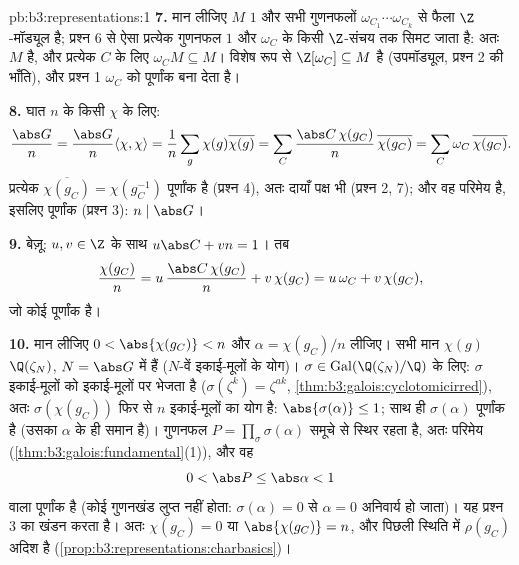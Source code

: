 \begin{solution}{pb:b3:representations:1}
\textbf{7.} मान लीजिए $M$ $1$ और सभी गुणनफलों $\omega_{C_1}\cdots\omega_{C_k}$ से फैला
$\Z$-मॉड्यूल है; प्रश्न 6 से ऐसा प्रत्येक गुणनफल $1$ और $\omega_C$
के किसी $\Z$-संचय तक सिमट जाता है: अतः $M$  है, और
प्रत्येक $C$ के लिए $\omega_C M
\subseteq M$। विशेष रूप से $\Z[\omega_C]
\subseteq M$  है
(उपमॉड्यूल, प्रश्न 2 की भाँति), और प्रश्न 1 $\omega_C$ को  पूर्णांक
बना देता है।

\textbf{8.} घात $n$ के किसी  $\chi$ के लिए:
\[
\frac{\abs G}{n} = \frac{\abs G}{n}\langle\chi,\chi\rangle
= \frac1n \sum_{g}\chi(g)\overline{\chi(g)}
= \sum_{C}\frac{\abs C\,\chi(g_C)}{n}\,\overline{\chi(g_C)}
= \sum_C \omega_C\,\overline{\chi(g_C)} .
\]
प्रत्येक $\overline{\chi(g_C)} = \chi(g_C^{-1})$  पूर्णांक है (प्रश्न 4), अतः दायाँ पक्ष भी
(प्रश्न 2, 7); और वह परिमेय है, इसलिए पूर्णांक (प्रश्न 3): $n \mid \abs
G$।

\textbf{9.} बेज़ू: $u, v \in \Z$ के साथ $u\abs C + vn = 1$। तब
\[
\frac{\chi(g_C)}{n} = u\,\frac{\abs C\,\chi(g_C)}{n} +
v\,\chi(g_C) = u\,\omega_C + v\,\chi(g_C),
\]
जो कोई  पूर्णांक है।

\textbf{10.} मान लीजिए $0 < \abs{\chi(g_C)} < n$ और $\alpha
= \chi(g_C)/n$ लीजिए। सभी मान $\chi(g)$ $\Q(\zeta_N)$,
$N =
\abs G$ में हैं ($N$-वें इकाई-मूलों के योग)। $\sigma \in
\operatorname{Gal}(\Q(\zeta_N)/\Q)$ के लिए: $\sigma$
इकाई-मूलों को इकाई-मूलों पर भेजता है ($\sigma(\zeta^k) = \zeta^{ak}$, \cref{thm:b3:galois:cyclotomicirred}), अतः $\sigma(\chi(g_C))$ फिर
से $n$ इकाई-मूलों का योग है: $\abs{\sigma(\alpha)}
\leq 1$; साथ ही $\sigma(\alpha)$  पूर्णांक
है (उसका  $\alpha$ के ही समान है)। गुणनफल $P =
\prod_\sigma \sigma(\alpha)$ समूचे
 से स्थिर रहता है, अतः परिमेय (\cref{thm:b3:galois:fundamental}(1)), और वह
\[
0 < \abs P \leq \abs\alpha < 1
\]
वाला  पूर्णांक है (कोई गुणनखंड लुप्त नहीं होता: $\sigma(\alpha) = 0$ से $\alpha =
0$
अनिवार्य हो जाता)। यह प्रश्न 3 का खंडन करता है। अतः $\chi(g_C) = 0$ या $\abs{\chi(g_C)} = n$,
और पिछली स्थिति में $\rho(g_C)$ अदिश है (\cref{prop:b3:representations:charbasics})।


\end{solution}

